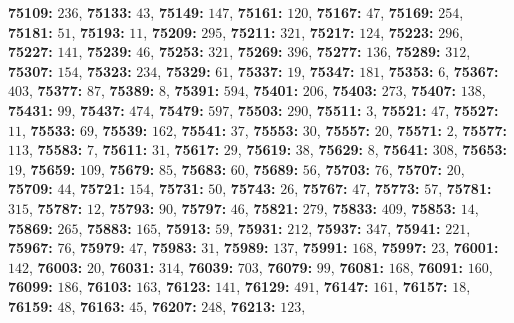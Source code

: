 \textsf{\bfseries 75109:} $236$, \textsf{\bfseries 75133:} $43$, \textsf{\bfseries 75149:} $147$, \textsf{\bfseries 75161:} $120$, \textsf{\bfseries 75167:} $47$, \textsf{\bfseries 75169:} $254$, \textsf{\bfseries 75181:} $51$, \textsf{\bfseries 75193:} $11$, \textsf{\bfseries 75209:} $295$, \textsf{\bfseries 75211:} $321$, \textsf{\bfseries 75217:} $124$, \textsf{\bfseries 75223:} $296$, \textsf{\bfseries 75227:} $141$, \textsf{\bfseries 75239:} $46$, \textsf{\bfseries 75253:} $321$, \textsf{\bfseries 75269:} $396$, \textsf{\bfseries 75277:} $136$, \textsf{\bfseries 75289:} $312$, \textsf{\bfseries 75307:} $154$, \textsf{\bfseries 75323:} $234$, \textsf{\bfseries 75329:} $61$, \textsf{\bfseries 75337:} $19$, \textsf{\bfseries 75347:} $181$, \textsf{\bfseries 75353:} $6$, \textsf{\bfseries 75367:} $403$, \textsf{\bfseries 75377:} $87$, \textsf{\bfseries 75389:} $8$, \textsf{\bfseries 75391:} $594$, \textsf{\bfseries 75401:} $206$, \textsf{\bfseries 75403:} $273$, \textsf{\bfseries 75407:} $138$, \textsf{\bfseries 75431:} $99$, \textsf{\bfseries 75437:} $474$, \textsf{\bfseries 75479:} $597$, \textsf{\bfseries 75503:} $290$, \textsf{\bfseries 75511:} $3$, \textsf{\bfseries 75521:} $47$, \textsf{\bfseries 75527:} $11$, \textsf{\bfseries 75533:} $69$, \textsf{\bfseries 75539:} $162$, \textsf{\bfseries 75541:} $37$, \textsf{\bfseries 75553:} $30$, \textsf{\bfseries 75557:} $20$, \textsf{\bfseries 75571:} $2$, \textsf{\bfseries 75577:} $113$, \textsf{\bfseries 75583:} $7$, \textsf{\bfseries 75611:} $31$, \textsf{\bfseries 75617:} $29$, \textsf{\bfseries 75619:} $38$, \textsf{\bfseries 75629:} $8$, \textsf{\bfseries 75641:} $308$, \textsf{\bfseries 75653:} $19$, \textsf{\bfseries 75659:} $109$, \textsf{\bfseries 75679:} $85$, \textsf{\bfseries 75683:} $60$, \textsf{\bfseries 75689:} $56$, \textsf{\bfseries 75703:} $76$, \textsf{\bfseries 75707:} $20$, \textsf{\bfseries 75709:} $44$, \textsf{\bfseries 75721:} $154$, \textsf{\bfseries 75731:} $50$, \textsf{\bfseries 75743:} $26$, \textsf{\bfseries 75767:} $47$, \textsf{\bfseries 75773:} $57$, \textsf{\bfseries 75781:} $315$, \textsf{\bfseries 75787:} $12$, \textsf{\bfseries 75793:} $90$, \textsf{\bfseries 75797:} $46$, \textsf{\bfseries 75821:} $279$, \textsf{\bfseries 75833:} $409$, \textsf{\bfseries 75853:} $14$, \textsf{\bfseries 75869:} $265$, \textsf{\bfseries 75883:} $165$, \textsf{\bfseries 75913:} $59$, \textsf{\bfseries 75931:} $212$, \textsf{\bfseries 75937:} $347$, \textsf{\bfseries 75941:} $221$, \textsf{\bfseries 75967:} $76$, \textsf{\bfseries 75979:} $47$, \textsf{\bfseries 75983:} $31$, \textsf{\bfseries 75989:} $137$, \textsf{\bfseries 75991:} $168$, \textsf{\bfseries 75997:} $23$, \textsf{\bfseries 76001:} $142$, \textsf{\bfseries 76003:} $20$, \textsf{\bfseries 76031:} $314$, \textsf{\bfseries 76039:} $703$, \textsf{\bfseries 76079:} $99$, \textsf{\bfseries 76081:} $168$, \textsf{\bfseries 76091:} $160$, \textsf{\bfseries 76099:} $186$, \textsf{\bfseries 76103:} $163$, \textsf{\bfseries 76123:} $141$, \textsf{\bfseries 76129:} $491$, \textsf{\bfseries 76147:} $161$, \textsf{\bfseries 76157:} $18$, \textsf{\bfseries 76159:} $48$, \textsf{\bfseries 76163:} $45$, \textsf{\bfseries 76207:} $248$, \textsf{\bfseries 76213:} $123$, 
